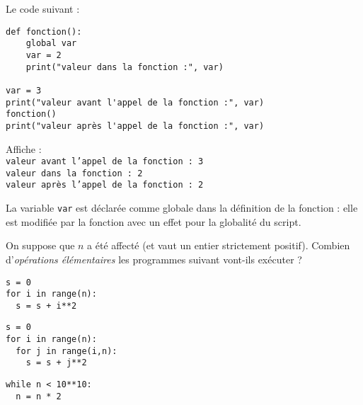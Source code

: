 \begin{boxedminipage}{\textwidth}
Le code suivant :
\begin{verbatim}
def fonction():
    global var
    var = 2
    print("valeur dans la fonction :", var)

var = 3
print("valeur avant l'appel de la fonction :", var)
fonction()
print("valeur après l'appel de la fonction :", var)
\end{verbatim}
Affiche :\\
\texttt{valeur avant l'appel de la fonction : 3}\\
\texttt{valeur dans la fonction : 2}\\
\texttt{valeur après l'appel de la fonction : 2}

La variable \texttt{var} est déclarée comme globale dans la définition de la fonction : elle est modifiée par la fonction avec un effet pour la globalité du script.
\end{boxedminipage}





On suppose que $n$ a été affecté (et vaut un entier strictement positif). Combien d’\textit{opérations élémentaires} les programmes suivant vont-ils exécuter ?

\begin{boxedminipage}{\textwidth}
\begin{verbatim}
s = 0
for i in range(n):
  s = s + i**2
\end{verbatim}
\end{boxedminipage}


\begin{boxedminipage}{\textwidth}
\begin{verbatim}
s = 0
for i in range(n):
  for j in range(i,n):
    s = s + j**2
\end{verbatim}
\end{boxedminipage}

\begin{boxedminipage}{\textwidth}
\begin{verbatim}
while n < 10**10:
  n = n * 2
\end{verbatim}
\end{boxedminipage}




